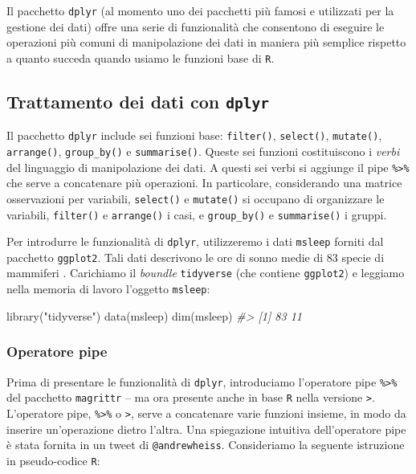 \documentclass[
  11pt,
]{krantz}
\makeatletter
\newenvironment{Shaded}{\begin{snugshade}}{\end{snugshade}}
\newcommand{\CommentTok}[1]{\textcolor[rgb]{0.37,0.37,0.37}{\textit{#1}}}
\newcommand{\FunctionTok}[1]{\textcolor[rgb]{0,0,0}{#1}}
\newcommand{\NormalTok}[1]{#1}
\newcommand{\StringTok}[1]{\textcolor[rgb]{0.5,0.5,0.5}{#1}}
\newenvironment{kframe}{%
\medskip{}
\setlength{\fboxsep}{.8em}
 \def\at@end@of@kframe{}%
 \ifinner\ifhmode%
  \def\at@end@of@kframe{\end{minipage}}%
  \begin{minipage}{\columnwidth}%
 \fi\fi%
 \def\FrameCommand##1{\hskip\@totalleftmargin \hskip-\fboxsep
 \colorbox{shadecolor}{##1}\hskip-\fboxsep
     \hskip-\linewidth \hskip-\@totalleftmargin \hskip\columnwidth}%
 \MakeFramed {\advance\hsize-\width
   \@totalleftmargin\z@ \linewidth\hsize
   \@setminipage}}%
 {\par\unskip\endMakeFramed%
 \at@end@of@kframe}
\renewenvironment{Shaded}{\begin{kframe}}{\end{kframe}}
\theoremstyle{definition}
\theoremstyle{definition}
\theoremstyle{definition}
\theoremstyle{definition}
\theoremstyle{remark}
\makeatother
\begin{document}
Il pacchetto \texttt{dplyr} (al momento uno dei pacchetti più famosi e utilizzati per la gestione dei dati) offre una serie di funzionalità che consentono di eseguire le operazioni più comuni di manipolazione dei dati in maniera più semplice rispetto a quanto succeda quando usiamo le funzioni base di \texttt{R}.

\hypertarget{trattamento-dei-dati-con-dplyr}{%
\subsection{\texorpdfstring{Trattamento dei dati con \texttt{dplyr}}{Trattamento dei dati con dplyr}}\label{trattamento-dei-dati-con-dplyr}}

Il pacchetto \texttt{dplyr} include sei funzioni base: \texttt{filter()}, \texttt{select()}, \texttt{mutate()}, \texttt{arrange()}, \texttt{group\_by()} e \texttt{summarise()}. Queste sei funzioni costituiscono i \emph{verbi} del linguaggio di manipolazione dei dati. A questi sei verbi si aggiunge il pipe \texttt{\%\textgreater{}\%} che serve a concatenare più operazioni. In particolare, considerando una matrice osservazioni per variabili, \texttt{select()} e \texttt{mutate()} si occupano di organizzare le variabili, \texttt{filter()} e \texttt{arrange()} i casi, e \texttt{group\_by()} e \texttt{summarise()} i gruppi.

Per introdurre le funzionalità di \texttt{dplyr}, utilizzeremo i dati \texttt{msleep} forniti dal pacchetto \texttt{ggplot2}. Tali dati descrivono le ore di sonno medie di 83 specie di mammiferi \citep{savage2007scaling}. Carichiamo il \emph{boundle} \texttt{tidyverse} (che contiene \texttt{ggplot2}) e leggiamo nella memoria di lavoro l'oggetto \texttt{msleep}:

\begin{Shaded}
\begin{Highlighting}[]
\FunctionTok{library}\NormalTok{(}\StringTok{"tidyverse"}\NormalTok{)}
\FunctionTok{data}\NormalTok{(msleep)}
\FunctionTok{dim}\NormalTok{(msleep)}
\CommentTok{\#\textgreater{} [1] 83 11}
\end{Highlighting}
\end{Shaded}

\hypertarget{operatore-pipe}{%
\subsubsection{Operatore pipe}\label{operatore-pipe}}

Prima di presentare le funzionalità di \texttt{dplyr}, introduciamo l'operatore pipe \texttt{\%\textgreater{}\%} del pacchetto \texttt{magrittr} -- ma ora presente anche in base \texttt{R} nella versione \texttt{\textbar{}\textgreater{}}. L'operatore pipe, \texttt{\%\textgreater{}\%} o \texttt{\textbar{}\textgreater{}}, serve a concatenare varie funzioni insieme, in modo da inserire un'operazione dietro l'altra. Una spiegazione intuitiva dell'operatore pipe è stata fornita in un tweet di \texttt{@andrewheiss}. Consideriamo la seguente istruzione in pseudo-codice \texttt{R}:
\end{document}

